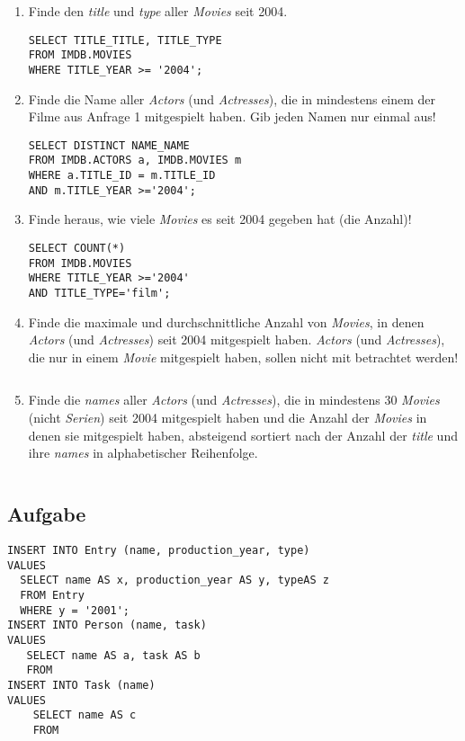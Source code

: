 \documentclass[11pt,a4paper,DIV=9]{scrartcl}
\newcounter{temp}
\newcommand{\aufgabe}[1]{
  \setcounter{temp}{\value{subsection}}
  \setcounter{subsection}{#1}
  \addtocounter{subsection}{-1}
  \subsection{Aufgabe}
  \setcounter{subsection}{\value{temp}}
}
\begin{document}
\begin{enumerate}

\item Finde den \textit{title} und \textit{type} aller \textit{Movies} seit 2004. 
\begin{lstlisting} 
SELECT TITLE_TITLE, TITLE_TYPE
FROM IMDB.MOVIES
WHERE TITLE_YEAR >= '2004';
\end{lstlisting}

\item Finde die Name aller \textit{Actors} (und \textit{Actresses}), die in mindestens einem der Filme aus Anfrage 1 mitgespielt haben. Gib jeden Namen nur einmal aus!
\begin{lstlisting}
SELECT DISTINCT NAME_NAME
FROM IMDB.ACTORS a, IMDB.MOVIES m
WHERE a.TITLE_ID = m.TITLE_ID
AND m.TITLE_YEAR >='2004';
\end{lstlisting}

\item Finde heraus, wie viele \textit{Movies} es seit 2004 gegeben hat (die Anzahl)!
\begin{lstlisting}
SELECT COUNT(*)
FROM IMDB.MOVIES
WHERE TITLE_YEAR >='2004'
AND TITLE_TYPE='film';
\end{lstlisting}

\item Finde die maximale und durchschnittliche Anzahl von \textit{Movies}, in denen \textit{Actors} (und \textit{Actresses}) seit 2004 mitgespielt haben. \textit{Actors} (und \textit{Actresses}), die nur in einem \textit{Movie} mitgespielt haben, sollen nicht mit betrachtet werden!
\begin{lstlisting}
\end{lstlisting}

\item Finde die \textit{names} aller \textit{Actors} (und \textit{Actresses}), die in mindestens 30 \textit{Movies} (nicht \textit{Serien}) seit 2004 mitgespielt haben und die Anzahl der \textit{Movies} in denen sie mitgespielt haben, absteigend sortiert nach der Anzahl der \textit{title} und ihre \textit{names} in alphabetischer Reihenfolge.
\begin{lstlisting}
\end{lstlisting}
\end{enumerate}

\aufgabe{4}
\begin{lstlisting}
INSERT INTO Entry (name, production_year, type)
VALUES
  SELECT name AS x, production_year AS y, typeAS z
  FROM Entry
  WHERE y = '2001';
INSERT INTO Person (name, task)
VALUES
   SELECT name AS a, task AS b
   FROM 
INSERT INTO Task (name)
VALUES
    SELECT name AS c
    FROM 
\end{lstlisting}
\end{document}
